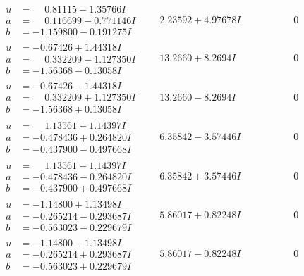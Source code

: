 \documentclass[1p]{elsarticle_modified}
\theoremstyle{definition}
\begin{document}
$$\begin{array}{c|c|c}
\begin{aligned}
u &= \phantom{-}0.81115 - 1.35766 I \\
a &= \phantom{-}0.116699 - 0.771146 I \\
b &= -1.159800 - 0.191275 I\end{aligned}
 & \phantom{-}2.23592 + 4.97678 I & \phantom{-0.000000 } 0 \\ \hline\begin{aligned}
u &= -0.67426 + 1.44318 I \\
a &= \phantom{-}0.332209 - 1.127350 I \\
b &= -1.56368 - 0.13058 I\end{aligned}
 & \phantom{-}13.2660 + 8.2694 I & \phantom{-0.000000 } 0 \\ \hline\begin{aligned}
u &= -0.67426 - 1.44318 I \\
a &= \phantom{-}0.332209 + 1.127350 I \\
b &= -1.56368 + 0.13058 I\end{aligned}
 & \phantom{-}13.2660 - 8.2694 I & \phantom{-0.000000 } 0 \\ \hline\begin{aligned}
u &= \phantom{-}1.13561 + 1.14397 I \\
a &= -0.478436 + 0.264820 I \\
b &= -0.437900 - 0.497668 I\end{aligned}
 & \phantom{-}6.35842 - 3.57446 I & \phantom{-0.000000 } 0 \\ \hline\begin{aligned}
u &= \phantom{-}1.13561 - 1.14397 I \\
a &= -0.478436 - 0.264820 I \\
b &= -0.437900 + 0.497668 I\end{aligned}
 & \phantom{-}6.35842 + 3.57446 I & \phantom{-0.000000 } 0 \\ \hline\begin{aligned}
u &= -1.14800 + 1.13498 I \\
a &= -0.265214 - 0.293687 I \\
b &= -0.563023 - 0.229679 I\end{aligned}
 & \phantom{-}5.86017 + 0.82248 I & \phantom{-0.000000 } 0 \\ \hline\begin{aligned}
u &= -1.14800 - 1.13498 I \\
a &= -0.265214 + 0.293687 I \\
b &= -0.563023 + 0.229679 I\end{aligned}
 & \phantom{-}5.86017 - 0.82248 I & \phantom{-0.000000 } 0 \\ \hline\begin{aligned}

\end{aligned}
\end{array}$$
\end{document}
